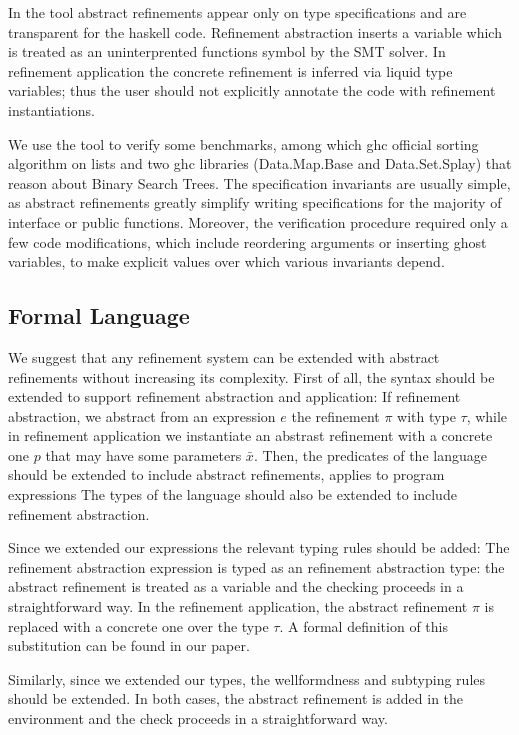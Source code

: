 In the tool abstract refinements appear only on type specifications
and are transparent for the haskell code.
Refinement abstraction inserts a variable which is treated as an uninterprented functions
symbol by the SMT solver. 
In refinement application the concrete refinement is inferred via liquid 
type variables; thus the user should not explicitly annotate the code with refinement instantiations.


We use the tool to verify 
some benchmarks, among which ghc official sorting algorithm on lists
and two ghc libraries (Data.Map.Base and Data.Set.Splay) that reason about Binary Search Trees.
The specification invariants are usually simple, as abstract refinements
greatly simplify writing specifications for the majority of interface or public functions.
Moreover, the verification procedure required only a few code modifications, 
which include reordering arguments or inserting ghost variables, 
to make explicit values over which various invariants depend.

\subsection{Formal Language}
We suggest that any refinement system can be extended with abstract refinements
without increasing its complexity.
%
First of all, the syntax should be extended to support refinement abstraction
and application:		
If refinement abstraction, we abstract from an expression $e$
the refinement $\pi$ with type $\tau$, while in refinement application
we instantiate an abstrast refinement with a concrete one $p$
that may have some parameters $\bar{x}$.
%
Then, the predicates of the language should be extended to 
include abstract refinements, applies to program expressions
%
The types of the language should also be extended to include 
refinement abstraction.
%

Since we extended our expressions the relevant typing rules should be added:
The refinement abstraction expression is typed as an refinement abstraction
type: the abstract refinement is treated as a variable
and the checking proceeds in a straightforward way.
In the refinement application, the abstract refinement $\pi$ is replaced with a concrete one
over the type $\tau$. A formal definition of this substitution can be found in our paper.

Similarly, since we extended our types, the wellformdness and subtyping 
rules should be extended.
In both cases, the abstract refinement is added in the environment
and the check proceeds in a straightforward way.

